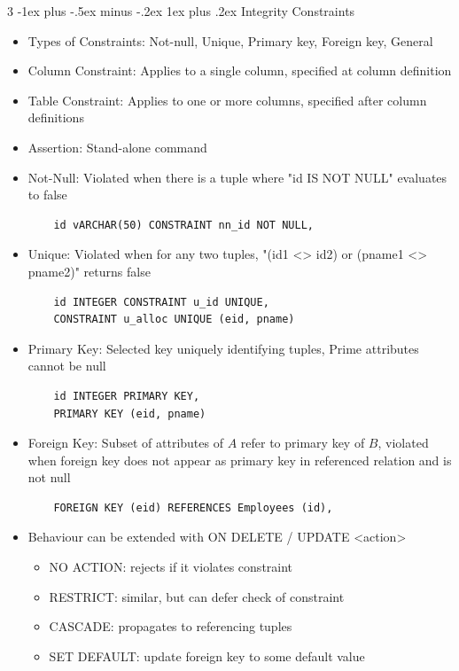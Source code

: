 \documentclass[10pt, landscape]{article}
\makeatletter
\renewcommand{\subsection}{\@startsection{subsection}{3}{0mm}%
                                {-1ex plus -.5ex minus -.2ex}%
                                {1ex plus .2ex}%
                                {\normalfont\small\bfseries}}%
\makeatother
\begin{document}
\begin{multicols*}{3}
\subsection{Integrity Constraints}
\begin{itemize}
    \item Types of Constraints: Not-null, Unique, Primary key, Foreign key, General
    \item Column Constraint: Applies to a single column, specified at column definition
    \item Table Constraint: Applies to one or more columns, specified after column definitions
    \item Assertion: Stand-alone command
    \item Not-Null: Violated when there is a tuple where "id IS NOT NULL" evaluates to false
    \begin{verbatim}
    id vARCHAR(50) CONSTRAINT nn_id NOT NULL,
    \end{verbatim}
    \item Unique: Violated when for any two tuples, "(id1 <> id2) or (pname1 <> pname2)" returns false
    \begin{verbatim}
    id INTEGER CONSTRAINT u_id UNIQUE,
    CONSTRAINT u_alloc UNIQUE (eid, pname)
    \end{verbatim}
    \item Primary Key: Selected key uniquely identifying tuples, Prime attributes cannot be null
    \begin{verbatim}
    id INTEGER PRIMARY KEY,
    PRIMARY KEY (eid, pname)
    \end{verbatim}
    \item Foreign Key: Subset of attributes of $A$ refer to primary key of $B$, violated when foreign key does not appear as primary key in referenced relation and is not null
    \begin{verbatim}
    FOREIGN KEY (eid) REFERENCES Employees (id),
    \end{verbatim}
    \item Behaviour can be extended with ON DELETE / UPDATE <action>
    \begin{itemize}
        \item NO ACTION: rejects if it violates constraint
        \item RESTRICT: similar, but can defer check of constraint
        \item CASCADE: propagates to referencing tuples
        \item SET DEFAULT: update foreign key to some default value

\end{itemize}
\end{itemize}
\end{multicols*}
\end{document}
